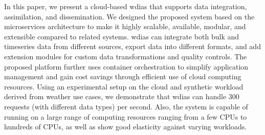 \documentclass[conference]{IEEEtran}
\begin{document}

In this paper, we present a cloud-based \acrfull{wdias} that supports data integration, assimilation, and dissemination. We designed the proposed system based on the microservices architecture to make it highly scalable, available, modular, and extensible compared to related systems. \acrshort{wdias} can integrate both bulk and timeseries data from different sources, export data into different formats, and add extension modules for custom data transformations and quality controls. The proposed platform further uses container orchestration to simplify application management and gain cost savings through efficient use of cloud computing resources. 
Using an experimental setup on the cloud and synthetic workload derived from weather use cases, we demonstrate that \acrshort{wdias} can handle 300 requests (with different data types) per second. Also, the system is capable of running on a large range of computing resources ranging from a few CPUs to hundreds of CPUs, as well as show good elasticity against varying workloads.
\end{document}
